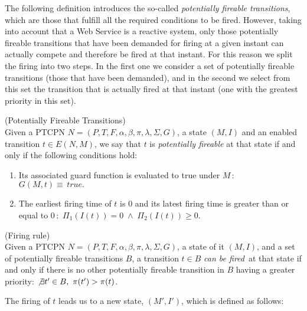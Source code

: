 {The following definition introduces the so-called {\em potentially
fireable transitions}, which are those that fulfill all the
required conditions to be fired. However, taking into account
that a Web Service is a reactive system, only those potentially
fireable transitions that have been demanded for firing at a given
instant can actually compete and therefore be fired at that instant.
For this reason we split the firing into two steps.
In the first one we consider a set of potentially fireable
transitions (those that have been demanded), and
in the second we select from this set the transition
that is actually fired at that instant (one with the greatest
priority in this set).

\bdfn(Potentially Fireable Transitions)\\
Given a PTCPN $N=(P,T,F,\alpha,\beta,\pi,\lambda,\Sigma, G)$, a
state $(M,I)$ and an enabled transition $t\in E(N,M)$, we say that
$t$ is {\it potentially fireable} at that state if and only if the
following conditions hold:
\begin{enumerate}
\item Its associated guard function  is evaluated to true under $M\,$:
$G(M,t)\equiv\, true.$
\item\label{condtemp} The earliest firing time of $t$ is 0
and its latest firing time is greater than or equal to 0\,:
\,$\Pi_1(I(t))=0\; \wedge \; \Pi_2(I(t)) \geq 0$.
\end{enumerate}
\edfn

\bdfn (Firing rule)\\
Given a PTCPN $N=(P,T,F,\alpha,\beta,\pi,\lambda,\Sigma, G)$, a
state of it $(M,I)$, and a set of potentially fireable transitions
$B$, a transition $t \in B$ {\em can be fired}\, at that state if
and only if
there is no other potentially fireable transition in $B$
having a greater priority:
$\not\exists t'\in B,\, \, \pi(t')>\pi(t)$.

The firing of $t$ leads us to a new state, $(M',I')$, which is
defined as follows:

}
